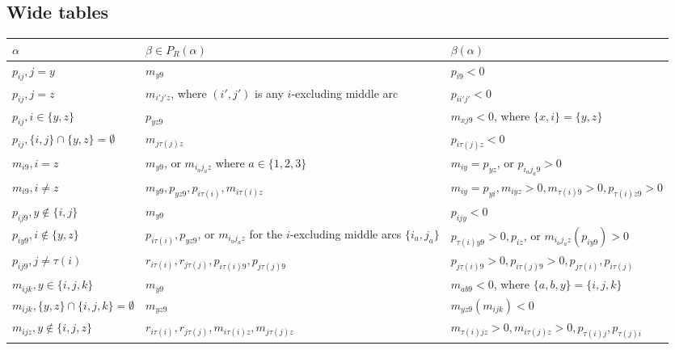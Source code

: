 \documentclass[11pt]{amsart}
\theoremstyle{plain}
\theoremstyle{definition}
\theoremstyle{remark}
\numberwithin{equation}{section}
\newcommand{\al}{\alpha}
\newcommand{\be}{\beta}
\newcommand{\pra}{P_R(\al)}
\begin{document}
\appendix
\begin{landscape}
%
\section{Wide tables}
\label{sec:wide_tables}

\begin{table}[b]
      \centering
\begin{tabular}{@{}lll@{}}
\toprule
  $\al$ & $\be\in \pra$ & $\be(\al)$ \\
  \midrule
  $p_{ij}, j=y$ & $m_{y9}$  & $p_{i9}<0$ \\
  $p_{ij}, j=z$ & $m_{i'j'z}$, where $(i',j')$ is any $i$-excluding middle arc& $p_{ii'j'}<0$ \\
  $p_{ij}, i\in \{y,z\}$ & $p_{yz9}$ & $m_{xj9}<0$, where $\{x,i\}=\{y,z\}$ \\
  $p_{ij}, \{i,j\}\cap\{y,z\}=\emptyset$ & $m_{j\tau(j)z}$ & $p_{i\tau(j)z}<0$\\
  \midrule
  $m_{i9}, i=z$ & $m_{y9}$, or $m_{i_aj_az}$ where $a\in \{1,2,3\}$ &
  $m_{iy}=p_{yz}$, or $p_{i_aj_a9}>0$ \\
  $m_{i9}, i\neq z$ & $m_{y9}, p_{yz9}, p_{i\tau(i)}, m_{i\tau(i)z}$ &
$m_{iy}=p_{yi}, m_{iyz}>0, m_{\tau(i)9}>0, p_{\tau(i)z9}>0$ \\
  \midrule
  $p_{ij9}, y\notin \{i,j\}$ & $m_{y9}$ & $p_{ijy}<0$\\
  $p_{iy9}, i\notin \{y,z\}$ & $p_{i\tau(i)}, p_{yz9}$, or $m_{i_aj_az}$ for the
   $i$-excluding middle arcs $\{i_a,j_a\}$  & $p_{\tau(i)y9}>0, p_{iz}$, or $m_{i_aj_az}(p_{iy9})>0$\\
  $p_{ij9}, j\neq \tau(i)$& $r_{i\tau(i)}, r_{j\tau(j)}, p_{i\tau(i)9},
  p_{j\tau(j)9}$   & $p_{j\tau(i)9}>0, p_{i\tau(j)9}>0, p_{j\tau(i)}, p_{i\tau(j)}$ \\ 
  \midrule
  $m_{ijk}, y\in \{i,j,k\}$ & $m_{y9}$ & $m_{ab9}<0$, where
  $\{a,b,y\}=\{i,j,k\}$\\
  $m_{ijk}, \{y,z\}\cap \{i,j,k\}=\emptyset$ & $m_{yz9}$ & $m_{yz9}(m_{ijk})<0$\\
  $m_{ijz}, y\notin \{i,j,z\}$ & $r_{i\tau(i)}, r_{j\tau(j)}, m_{i\tau(i)z},
  m_{j\tau(j)z}$ & $m_{\tau(i)jz}>0, m_{i\tau(j)z}>0, p_{\tau(i)j},
  p_{\tau(j)i}$\\
  \bottomrule

\end{tabular}
\end{table}
\end{landscape}
\end{document}

